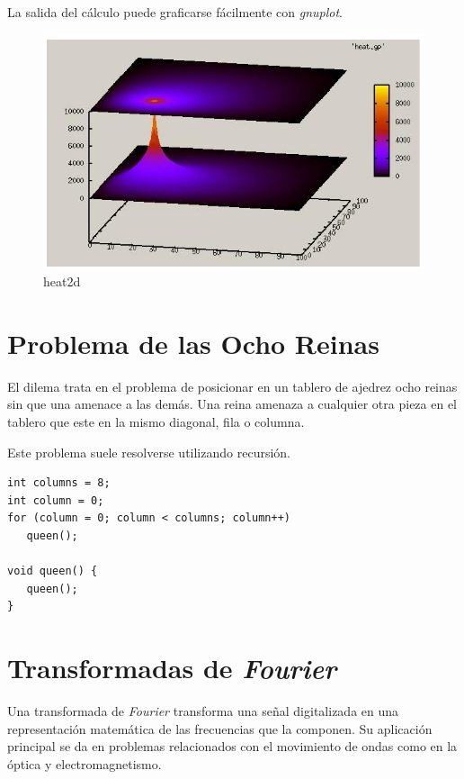 \documentclass[a4paper]{report}
\begin{document}
La salida del c\'alculo puede graficarse f\'acilmente con {\it gnuplot}.

\begin{figure}[H]
\begin{center}
\includegraphics[width=12cm]{heat2d.png}
\caption{heat2d}
\end{center}
\end{figure}

\section{Problema de las Ocho Reinas}

El dilema trata en el problema de posicionar en un tablero de ajedrez ocho
reinas sin que una amenace a las dem\'as. Una reina amenaza a cualquier otra
pieza en el tablero que este en la mismo diagonal, fila o columna.

\bigskip

Este problema suele resolverse utilizando recursi\'on.

\begin{verbatim}
int columns = 8;
int column = 0;
for (column = 0; column < columns; column++)
   queen();

void queen() {
   queen();
}
\end{verbatim}

\section{Transformadas de {\it Fourier}}

Una transformada de {\it Fourier} \cite{fourier} transforma una se\~nal
digitalizada en una representaci\'on matem\'atica de las frecuencias que la
componen. Su aplicaci\'on principal se da en problemas relacionados con el
movimiento de ondas como en la \'optica y electromagnetismo.
\end{document}

